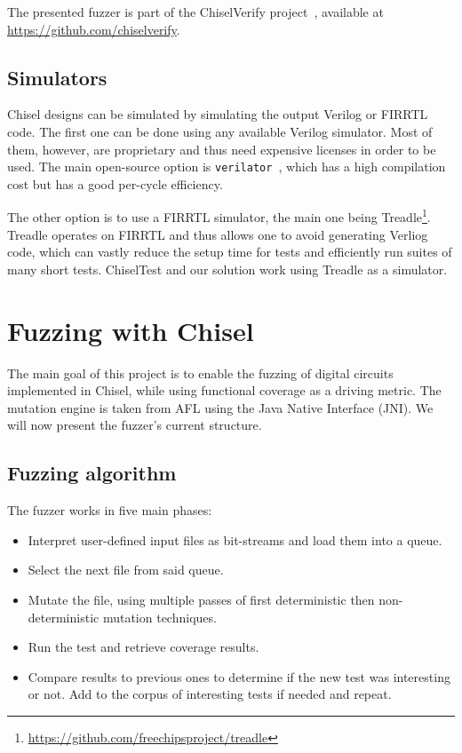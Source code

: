 \documentclass[conference]{IEEEtran}
\newcommand{\todo}[1]{{\color{olive} TODO: #1}}
\begin{document}
The presented fuzzer is part of the ChiselVerify project~\cite{verify:chisel:2020, dobis2021opensource}, available
at \url{https://github.com/chiselverify}.

\subsection{Simulators}

Chisel designs can be simulated by simulating the output Verilog or FIRRTL code.
The first one can be done using any available Verilog simulator.
Most of them, however, are proprietary and thus need expensive licenses in order to be used. 
The main open-source option is \texttt{verilator}~\cite{verilator}, which has a high compilation cost but has a good per-cycle efficiency.

The other option is to use a FIRRTL simulator, the main one being Treadle\footnote{\url{https://github.com/freechipsproject/treadle}}.
Treadle operates on FIRRTL and thus allows one to avoid generating Verliog code, which can vastly reduce the setup time for tests and efficiently run suites of many short tests.
ChiselTest and our solution work using Treadle as a simulator. 


\section{Fuzzing with Chisel}
\label{sec:fuzz}
The main goal of this project is to enable the fuzzing of digital circuits implemented in Chisel, while using functional coverage as a driving metric.
The mutation engine is taken from AFL using the Java Native Interface (JNI).
We will now present the fuzzer's current structure.

\subsection{Fuzzing algorithm}  
The fuzzer works in five main phases:  
\begin{itemize}
\item Interpret user-defined input files as bit-streams and load them into a queue.
\item Select the next file from said queue.
\item Mutate the file, using multiple passes of first deterministic then non-deterministic mutation techniques.  
\item Run the test and retrieve coverage results. 
\item Compare results to previous ones to determine if the new test was interesting or not. Add to the corpus of interesting tests if needed and repeat. 
\end{itemize}  
\end{document}
